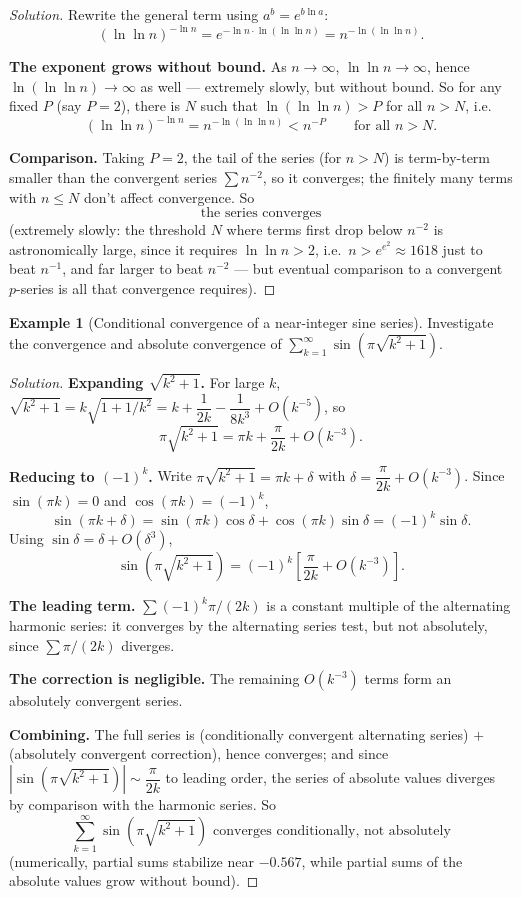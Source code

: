 \documentclass[11pt]{article}
\theoremstyle{definition}
\newtheorem{example}{Example}[section]
\begin{document}
\begin{proof}[Solution]
Rewrite the general term using $a^b=e^{b\ln a}$:
\[
(\ln\ln n)^{-\ln n}=e^{-\ln n\cdot\ln(\ln\ln n)}=n^{-\ln(\ln\ln n)}.
\]

\textbf{The exponent grows without bound.} As $n\to\infty$, $\ln\ln n\to\infty$, hence $\ln(\ln\ln n)\to\infty$ as well — extremely slowly, but without bound. So for any fixed $P$ (say $P=2$), there is $N$ such that $\ln(\ln\ln n)>P$ for all $n>N$, i.e.\
\[
(\ln\ln n)^{-\ln n}=n^{-\ln(\ln\ln n)}<n^{-P}\qquad\text{for all }n>N.
\]

\textbf{Comparison.} Taking $P=2$, the tail of the series (for $n>N$) is term-by-term smaller than the convergent series $\sum n^{-2}$, so it converges; the finitely many terms with $n\le N$ don't affect convergence. So
\[
\boxed{\text{the series converges}}
\]
(extremely slowly: the threshold $N$ where terms first drop below $n^{-2}$ is astronomically large, since it requires $\ln\ln n>2$, i.e.\ $n>e^{e^2}\approx1618$ just to beat $n^{-1}$, and far larger to beat $n^{-2}$ — but eventual comparison to a convergent $p$-series is all that convergence requires).
\end{proof}

\begin{example}[Conditional convergence of a near-integer sine series]
Investigate the convergence and absolute convergence of $\displaystyle\sum_{k=1}^\infty \sin\!\left(\pi\sqrt{k^2+1}\right)$.
\end{example}

\begin{proof}[Solution]
\textbf{Expanding $\sqrt{k^2+1}$.} For large $k$, $\sqrt{k^2+1}=k\sqrt{1+1/k^2}=k+\dfrac1{2k}-\dfrac1{8k^3}+O(k^{-5})$, so
\[
\pi\sqrt{k^2+1}=\pi k+\frac\pi{2k}+O(k^{-3}).
\]

\textbf{Reducing to $(-1)^k$.} Write $\pi\sqrt{k^2+1}=\pi k+\delta$ with $\delta=\dfrac\pi{2k}+O(k^{-3})$. Since $\sin(\pi k)=0$ and $\cos(\pi k)=(-1)^k$,
\[
\sin(\pi k+\delta)=\sin(\pi k)\cos\delta+\cos(\pi k)\sin\delta=(-1)^k\sin\delta.
\]
Using $\sin\delta=\delta+O(\delta^3)$,
\[
\sin\!\left(\pi\sqrt{k^2+1}\right)=(-1)^k\left[\frac\pi{2k}+O(k^{-3})\right].
\]

\textbf{The leading term.} $\sum(-1)^k\pi/(2k)$ is a constant multiple of the alternating harmonic series: it converges by the alternating series test, but not absolutely, since $\sum\pi/(2k)$ diverges.

\textbf{The correction is negligible.} The remaining $O(k^{-3})$ terms form an absolutely convergent series.

\textbf{Combining.} The full series is (conditionally convergent alternating series) $+$ (absolutely convergent correction), hence converges; and since $\left|\sin(\pi\sqrt{k^2+1})\right|\sim\dfrac\pi{2k}$ to leading order, the series of absolute values diverges by comparison with the harmonic series. So
\[
\boxed{\sum_{k=1}^\infty\sin\!\left(\pi\sqrt{k^2+1}\right) \text{ converges conditionally, not absolutely}}
\]
(numerically, partial sums stabilize near $-0.567$, while partial sums of the absolute values grow without bound).
\end{proof}
\end{document}
